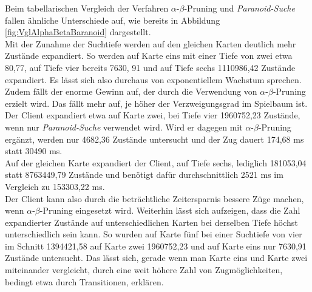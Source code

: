 \documentclass[12pt,a4paper,bibliography=totocnumbered,listof=totocnumbered,ngerman]{scrartcl}
\begin{document}
Beim tabellarischen Vergleich der Verfahren $\alpha$-$\beta$-Pruning und \emph{Paranoid-Suche} fallen ähnliche Unterschiede auf, wie bereits in Abbildung \ref{fig:VglAlphaBetaBaranoid} dargestellt. \\
Mit der Zunahme der Suchtiefe werden auf den gleichen Karten deutlich mehr Zustände expandiert. So werden auf Karte eins mit einer Tiefe von zwei etwa 80,77, auf Tiefe vier bereits 7630, 91 und auf Tiefe sechs 1110986,42 Zustände expandiert. Es lässt sich also durchaus von exponentiellem Wachstum sprechen. \\
Zudem fällt der enorme Gewinn auf, der durch die Verwendung von $\alpha$-$\beta$-Pruning erzielt wird. Das fällt mehr auf, je höher der Verzweigungsgrad im Spielbaum ist. Der Client expandiert etwa auf Karte zwei, bei Tiefe vier 1960752,23 Zustände, wenn nur \emph{Paranoid-Suche} verwendet wird. Wird er dagegen mit $\alpha$-$\beta$-Pruning ergänzt, werden nur 4682,36 Zustände untersucht und der Zug dauert 174,68 ms statt 30490 ms.\\
Auf der gleichen Karte expandiert der Client, auf Tiefe sechs, lediglich 181053,04 statt 8763449,79 Zustände und benötigt dafür durchschnittlich 2521 ms im Vergleich zu 153303,22 ms.\\
Der Client kann also durch die beträchtliche Zeitersparnis bessere Züge machen, wenn  $\alpha$-$\beta$-Pruning eingesetzt wird.
Weiterhin lässt sich aufzeigen, dass die Zahl expandierter Zustände auf unterschiedlichen Karten bei derselben Tiefe höchst unterschiedlich sein kann. So wurden auf Karte fünf bei einer Suchtiefe von vier im Schnitt 1394421,58 auf Karte zwei 1960752,23 und auf Karte eins nur 7630,91 Zustände untersucht. Das lässt sich, gerade wenn man Karte eins und Karte zwei miteinander vergleicht, durch eine weit höhere Zahl von Zugmöglichkeiten, bedingt etwa durch Transitionen, erklären. 

\newpage
\end{document}
